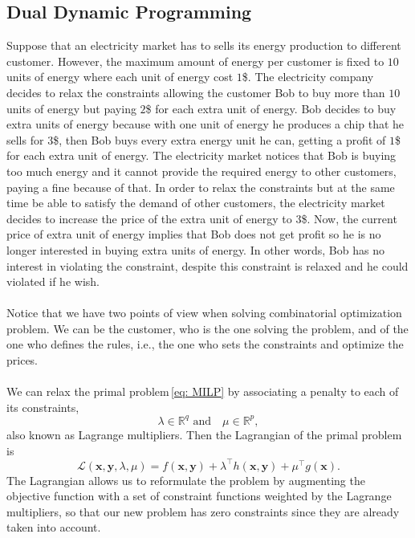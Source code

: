 \subsection{Dual Dynamic Programming}
Suppose that an electricity market has to sells its energy production to different customer. However, the maximum amount of energy per customer is fixed to $10$ units of energy where each unit of energy cost $1$\$. The electricity company decides to relax the constraints allowing the customer Bob to buy more than $10$ units of energy but paying $2$\$ for each extra unit of energy. Bob decides to buy extra units of energy because with one unit of energy he produces a chip that he sells for $3$\$, then Bob buys every extra energy unit he can, getting a profit of $1$\$ for each extra unit of energy. The electricity market notices that Bob is buying too much energy and it cannot provide the required energy to other customers, paying a fine because of that. In order to relax the constraints but at the same time be able to satisfy the demand of other customers, the electricity market decides to increase the price of the extra unit of energy to $3$\$. Now, the current price of extra unit of energy implies that Bob does not get profit so he is no longer interested in buying extra units of energy. In other words, Bob has no interest in violating the constraint, despite this constraint is relaxed and he could violated if he wish.\\\\
Notice that we have two points of view when solving combinatorial optimization problem. We can be the customer, who is the one solving the problem, and of the one who defines the rules, i.e., the one who sets the constraints and optimize the prices.\\\\
We can relax the primal problem\,\eqref{eq: MILP} by associating a penalty to each of its constraints,
\begin{equation}
    \lambda\in\mathbb{R}^{q}\,\, \text{and} \quad \mu\in\mathbb{R}^{p},
\end{equation}
also known as Lagrange multipliers. Then the Lagrangian of the primal problem is
\begin{equation}
    \mathcal{L}(\mathbf{x},\mathbf{y}, \lambda, \mu) = f(\mathbf{x}, \mathbf{y}) + \lambda^{\intercal}h(\mathbf{x},\mathbf{y}) + \mu^{\intercal}g(\mathbf{x}).
\end{equation}
The Lagrangian allows us to reformulate the problem by augmenting the objective function with a set of constraint functions weighted by the Lagrange multipliers, so that our new problem has zero constraints since they are already taken into account.
